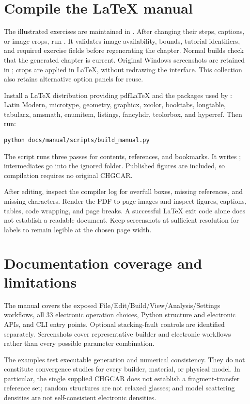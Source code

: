 \section{Compile the LaTeX manual}
The illustrated exercises are maintained in . After changing their steps, captions, or image crops, run . It validates image availability, bounds, tutorial identifiers, and required exercise fields before regenerating the chapter. Normal builds check that the generated chapter is current. Original Windows screenshots are retained in ; crops are applied in LaTeX, without redrawing the interface. This collection also retains alternative option panels for reuse.

Install a LaTeX distribution providing pdfLaTeX and the packages used by : Latin Modern, microtype, geometry, graphicx, xcolor, booktabs, longtable, tabularx, amsmath, enumitem, listings, fancyhdr, tcolorbox, and hyperref. Then run:
\begin{lstlisting}
python docs/manual/scripts/build_manual.py
\end{lstlisting}
The script runs three passes for contents, references, and bookmarks. It writes ; intermediates go into the ignored  folder. Published figures are included, so compilation requires no original CHGCAR.

After editing, inspect the compiler log for overfull boxes, missing references, and missing characters. Render the PDF to page images and inspect figures, captions, tables, code wrapping, and page breaks. A successful LaTeX exit code alone does not establish a readable document. Keep screenshots at sufficient resolution for labels to remain legible at the chosen page width.

\section{Documentation coverage and limitations}
The manual covers the exposed File/Edit/Build/View/Analysis/Settings workflows, all 33 electronic operation choices, Python structure and electronic APIs, and CLI entry points. Optional stacking-fault controls are identified separately. Screenshots cover representative builder and electronic workflows rather than every possible parameter combination.

The examples test executable generation and numerical consistency. They do not constitute convergence studies for every builder, material, or physical model. In particular, the single supplied CHGCAR does not establish a fragment-transfer reference set; random structures are not relaxed glasses; and model scattering densities are not self-consistent electronic densities.

